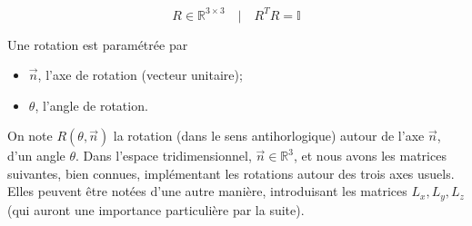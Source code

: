 \documentclass[../notesdecours.tex]{subfiles}
\begin{document}
$$R\in \mathbb{R}^{3\times3} \quad |\quad R^T R = \mathbb{I}$$

Une rotation est paramétrée par 
\begin{itemize}
    \item $\vec n$, l'axe de rotation (vecteur unitaire);
    \item $\theta$, l'angle de rotation.
\end{itemize}
On note $R(\theta, \vec n)$ la rotation (dans le sens antihorlogique) autour de l'axe $\vec n$, d'un angle $\theta$. Dans l'espace tridimensionnel, $\vec{n} \in \mathbb{R}^3$, et nous avons les matrices suivantes, bien connues, implémentant les rotations autour des trois axes usuels. Elles peuvent être notées d'une autre manière, introduisant les matrices $L_x, L_y, L_z$ (qui auront une importance particulière par la suite).
\end{document}
